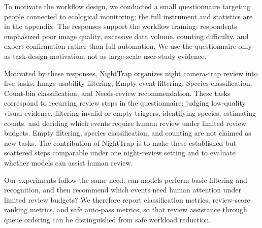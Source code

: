 \documentclass{article}
\begin{document}
To motivate the workflow design, we conducted a small questionnaire targeting people connected to ecological monitoring; the full instrument and statistics are in the appendix. The responses support the workflow framing: respondents emphasized poor image quality, excessive data volume, counting difficulty, and expert confirmation rather than full automation. We use the questionnaire only as task-design motivation, not as large-scale user-study evidence.

Motivated by these responses, NightTrap organizes night camera-trap review into five tasks: Image usability filtering, Empty-event filtering, Species classification, Count-bin classification, and Needs-review recommendation. These tasks correspond to recurring review steps in the questionnaire: judging low-quality visual evidence, filtering invalid or empty triggers, identifying species, estimating counts, and deciding which events require human review under limited review budgets. Empty filtering, species classification, and counting are not claimed as new tasks. The contribution of NightTrap is to make these established but scattered steps comparable under one night-review setting and to evaluate whether models can assist human review.

Our experiments follow the same need: can models perform basic filtering and recognition, and then recommend which events need human attention under limited review budgets? We therefore report classification metrics, review-score ranking metrics, and safe auto-pass metrics, so that review assistance through queue ordering can be distinguished from safe workload reduction.
\end{document}
